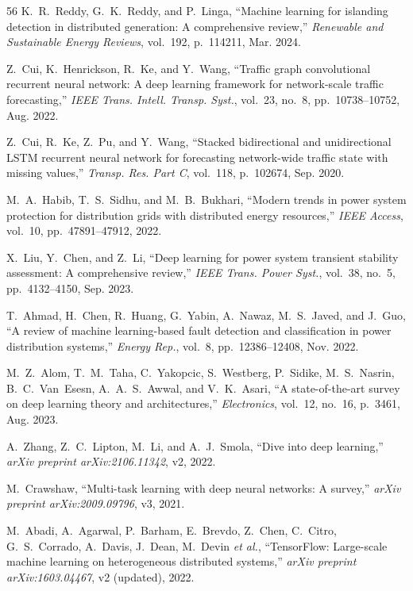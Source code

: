 \documentclass[journal]{IEEEtran}
\begin{document}
\begin{thebibliography}{56}
 K.~R.~Reddy, G.~K.~Reddy, and P.~Linga, ``Machine learning for islanding detection in distributed generation: A comprehensive review,'' \textit{Renewable and Sustainable Energy Reviews}, vol.~192, p.~114211, Mar. 2024.

 Z.~Cui, K.~Henrickson, R.~Ke, and Y.~Wang, ``Traffic graph convolutional recurrent neural network: A deep learning framework for network-scale traffic forecasting,'' \textit{IEEE Trans. Intell. Transp. Syst.}, vol.~23, no.~8, pp.~10738--10752, Aug. 2022.

 Z.~Cui, R.~Ke, Z.~Pu, and Y.~Wang, ``Stacked bidirectional and unidirectional LSTM recurrent neural network for forecasting network-wide traffic state with missing values,'' \textit{Transp. Res. Part C}, vol.~118, p.~102674, Sep. 2020.

 M.~A.~Habib, T.~S.~Sidhu, and M.~B.~Bukhari, ``Modern trends in power system protection for distribution grids with distributed energy resources,'' \textit{IEEE Access}, vol.~10, pp.~47891--47912, 2022.

 X.~Liu, Y.~Chen, and Z.~Li, ``Deep learning for power system transient stability assessment: A comprehensive review,'' \textit{IEEE Trans. Power Syst.}, vol.~38, no.~5, pp.~4132--4150, Sep. 2023.

 T.~Ahmad, H.~Chen, R.~Huang, G.~Yabin, A.~Nawaz, M.~S.~Javed, and J.~Guo, ``A review of machine learning-based fault detection and classification in power distribution systems,'' \textit{Energy Rep.}, vol.~8, pp.~12386--12408, Nov. 2022.

 M.~Z.~Alom, T.~M.~Taha, C.~Yakopcic, S.~Westberg, P.~Sidike, M.~S.~Nasrin, B.~C.~Van~Esesn, A.~A.~S.~Awwal, and V.~K.~Asari, ``A state-of-the-art survey on deep learning theory and architectures,'' \textit{Electronics}, vol.~12, no.~16, p.~3461, Aug. 2023.

 A.~Zhang, Z.~C.~Lipton, M.~Li, and A.~J.~Smola, ``Dive into deep learning,'' \textit{arXiv preprint arXiv:2106.11342}, v2, 2022.

 M.~Crawshaw, ``Multi-task learning with deep neural networks: A survey,'' \textit{arXiv preprint arXiv:2009.09796}, v3, 2021.

 M.~Abadi, A.~Agarwal, P.~Barham, E.~Brevdo, Z.~Chen, C.~Citro, G.~S.~Corrado, A.~Davis, J.~Dean, M.~Devin \emph{et al.}, ``TensorFlow: Large-scale machine learning on heterogeneous distributed systems,'' \textit{arXiv preprint arXiv:1603.04467}, v2 (updated), 2022.


\end{thebibliography}
\end{document}
